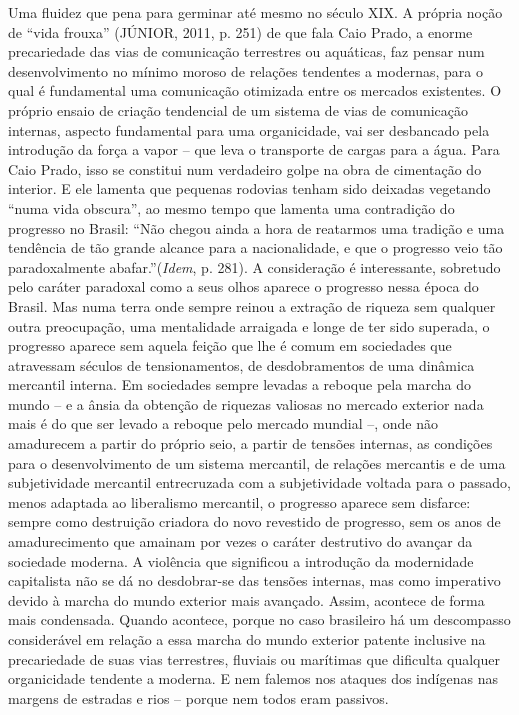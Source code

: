 Uma fluidez que pena para germinar até mesmo no século XIX. A própria
noção de ``vida frouxa'' (JÚNIOR, 2011, p. 251) de que fala Caio Prado,
a enorme precariedade das vias de comunicação terrestres ou aquáticas,
faz pensar num desenvolvimento no mínimo moroso de relações tendentes a
modernas, para o qual é fundamental uma comunicação otimizada entre os
mercados existentes. O próprio ensaio de criação tendencial de um
sistema de vias de comunicação internas, aspecto fundamental para uma
organicidade, vai ser desbancado pela introdução da força a vapor -- que
leva o transporte de cargas para a água. Para Caio Prado, isso se
constitui num verdadeiro golpe na obra de cimentação do interior. E ele
lamenta que pequenas rodovias tenham sido deixadas vegetando ``numa vida
obscura'', ao mesmo tempo que lamenta uma contradição do progresso no
Brasil: ``Não chegou ainda a hora de reatarmos uma tradição e uma
tendência de tão grande alcance para a nacionalidade, e que o progresso
veio tão paradoxalmente abafar.''(\emph{Idem}, p. 281). A consideração é
interessante, sobretudo pelo caráter paradoxal como a seus olhos aparece
o progresso nessa época do Brasil. Mas numa terra onde sempre reinou a
extração de riqueza sem qualquer outra preocupação, uma mentalidade
arraigada e longe de ter sido superada, o progresso aparece sem aquela
feição que lhe é comum em sociedades que atravessam séculos de
tensionamentos, de desdobramentos de uma dinâmica mercantil interna. Em
sociedades sempre levadas a reboque pela marcha do mundo -- e a ânsia da
obtenção de riquezas valiosas no mercado exterior nada mais é do que ser
levado a reboque pelo mercado mundial --, onde não amadurecem a partir
do próprio seio, a partir de tensões internas, as condições para o
desenvolvimento de um sistema mercantil, de relações mercantis e de uma
subjetividade mercantil entrecruzada com a subjetividade voltada para o
passado, menos adaptada ao liberalismo mercantil, o progresso aparece
sem disfarce: sempre como destruição criadora do novo revestido de
progresso, sem os anos de amadurecimento que amainam por vezes o caráter
destrutivo do avançar da sociedade moderna. A violência que significou a
introdução da modernidade capitalista não se dá no desdobrar-se das
tensões internas, mas como imperativo devido à marcha do mundo exterior
mais avançado. Assim, acontece de forma mais condensada. Quando
acontece, porque no caso brasileiro há um descompasso considerável em
relação a essa marcha do mundo exterior patente inclusive na
precariedade de suas vias terrestres, fluviais ou marítimas que
dificulta qualquer organicidade tendente a moderna. E nem falemos nos
ataques dos indígenas nas margens de estradas e rios -- porque nem todos
eram passivos.

